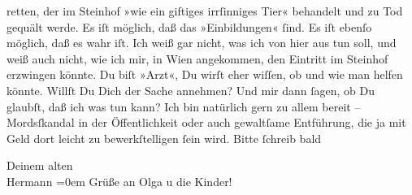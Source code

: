                retten, der im Steinhof »wie ein giftiges
               irrſinniges Tier« behandelt und zu Tod gequält werde. Es iſt möglich, daß das
               »Einbildungen«{ }ſind. Es iſt ebenſo möglich, daß es wahr iſt. Ich weiß gar nicht, was
               ich von hier aus tun soll, und weiß auch nicht, wie ich mir, in Wien angekommen, den Eintritt im Steinhof erzwingen könnte. Du biſt »Arzt«, Du wirſt eher wiſſen, ob und wie
               man helfen könnte. Willſt Du Dich der Sache annehmen? Und mir dann{ }ſagen, ob Du
               glaubſt, daß ich was tun kann? Ich bin natürlich gern zu allem bereit – Mordsſkandal
               in der Öffentlichkeit oder auch gewaltſame Entführung, die ja mit Geld dort leicht zu
               bewerkſtelligen{ }ſein wird. Bitte{ }ſchreib bald\pend
           
\pstart
           Deinem alten{\\[\baselineskip]}\spacefill\mbox{Hermann}\pend
           \leftskip=0em{}
\pstart
           \noindent{}Grüße an Olga u die Kinder!\pend
           \endnumbering{}  \newcommand{\dateiname}{L02121}\newcommand{\titel}{Hermann Bahr an Arthur Schnitzler, 16. 4. 1913}\newcommand{\editorInnen}{Herausgegeben von Martin Anton Müller}
